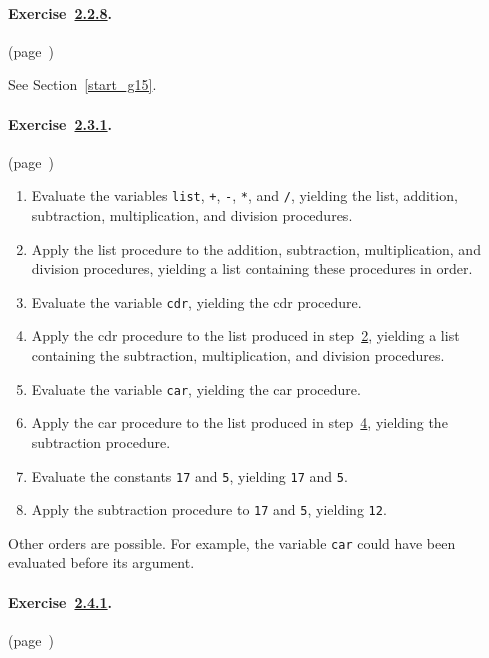 \paragraph{Exercise \hyperref[start_g14]{2.2.8}. }(page \pageref{start_s41})

  See Section \ref{start_g15}. 


\paragraph{Exercise \hyperref[start_g16]{2.3.1}. }(page \pageref{start_s49})

   \begin{enumerate}  \label{answers_g251}\item 
Evaluate the variables \texttt{list}, \texttt{+}, \texttt{-}, \texttt{*}, and \texttt{/}, yielding        the list, addition, subtraction, multiplication, and division procedures.  \label{answers_g252}\item \label{answers_listapply}Apply the list procedure to the addition, subtraction, multiplication, and division procedures,        yielding a list containing these procedures in order.  \label{answers_g253}\item Evaluate the variable \texttt{cdr}, yielding the cdr procedure.  \label{answers_g254}\item \label{answers_cdrapply}Apply the cdr procedure to the list produced in step \hyperref[answers_g252]{2},        yielding a list containing the subtraction, multiplication, and        division procedures.  \label{answers_g255}\item Evaluate the variable \texttt{car}, yielding the car procedure.  \label{answers_g256}\item Apply the car procedure to the list produced in step \hyperref[answers_g254]{4},        yielding the subtraction procedure.  \label{answers_g257}\item Evaluate the constants \texttt{17} and \texttt{5}, yielding        \texttt{17} and \texttt{5}.  \label{answers_g258}\item Apply the subtraction procedure to \texttt{17} and \texttt{5},        yielding \texttt{12}. \end{enumerate}
 
Other orders are possible.  For example, the variable \texttt{car} could have been evaluated before its argument. 



\paragraph{Exercise \hyperref[start_g18]{2.4.1}. }(page \pageref{start_s57})

